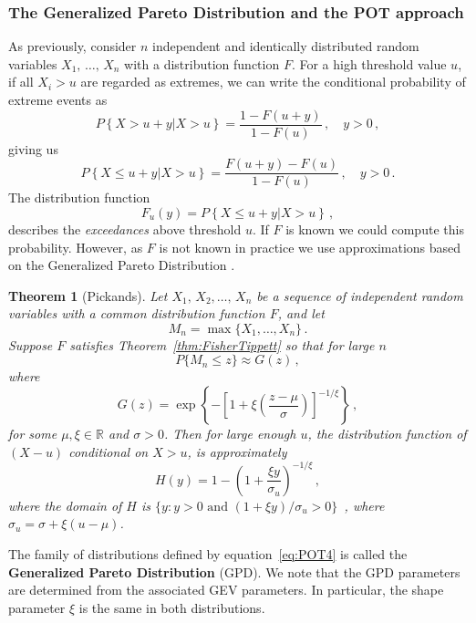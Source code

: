 \documentclass[letter,12pt]{article}
\newtheorem{theorem}{Theorem}
\begin{document}
\subsubsection{The Generalized Pareto Distribution and the POT approach} \label{sec:potapproach}
As previously, consider $n$ independent and identically distributed random variables $X_1, \, \ldots, \, X_n$ with a distribution function $F$.  For a high threshold value $u$, if all $X_i > u$ are regarded as extremes, we can write the conditional probability of extreme events as 
\begin{equation}\label{eq:POT1}
    P\left \{X > u + y | X > u \right \} = \frac{1 - F(u+y)}{1 - F(u)}\, , \quad y >0 \, , 
\end{equation}
giving us
\begin{equation}\label{eq:POT2}
    P\left \{X \leq u + y | X > u \right \} = \frac{ F(u+y) - F(u)}{1 - F(u)}\, , \quad y >0 \, . 
\end{equation}
The distribution function
\begin{equation}\label{eq:POT3}
    F_u(y) = P\left \{X \leq u + y | X > u \right \}\, , 
\end{equation}
describes the \textit{exceedances} above threshold $u$. If $F$ is known we could compute this probability. However, as $F$ is not known in practice we use approximations based on the Generalized Pareto Distribution \citep{Pickands1975}. 
\begin{theorem}[Pickands] Let $X_1, \, X_2, \ldots, \, X_n$  be a sequence of independent random variables with a common distribution function $F$, and let
$$ M_n = \max \{X_1, \ldots, X_n \} \, .
$$
Suppose $F$ satisfies Theorem~\ref{thm:FisherTippett} so that for large $n$
$$ P\{ M_n \leq z \} \approx G(z)\, , 
$$
where 
$$  G(z) = \exp\left\{ -\left[ 1 + \xi\left(\frac{z - \mu}{\sigma} \right)\right]^{-1/\xi} \right\}\, , 
$$
for some $\mu, \xi \in \mathbb{R}$ and $\sigma >0$. Then for large enough $u$, the distribution function of $(X-u)$ conditional on $X > u$, is approximately
\begin{equation}\label{eq:POT4}
    H(y) = 1 - \left( 1 + \frac{\xi y}{\sigma_u} \right)^{-1/\xi}\, , 
\end{equation}
where the domain of $H$ is $\{y: y >0\, \,    \text{and} \, \,  (1 + \xi y)/\sigma_u >0  \}$\, , where $\sigma_u = \sigma + \xi(u- \mu)$. 
\end{theorem}
The family of distributions defined by equation~\eqref{eq:POT4} is called the \textbf{Generalized Pareto Distribution} (GPD). We note that the GPD parameters are determined from the associated GEV parameters. In particular, the shape parameter $\xi$ is the same in both distributions. 
\end{document}
